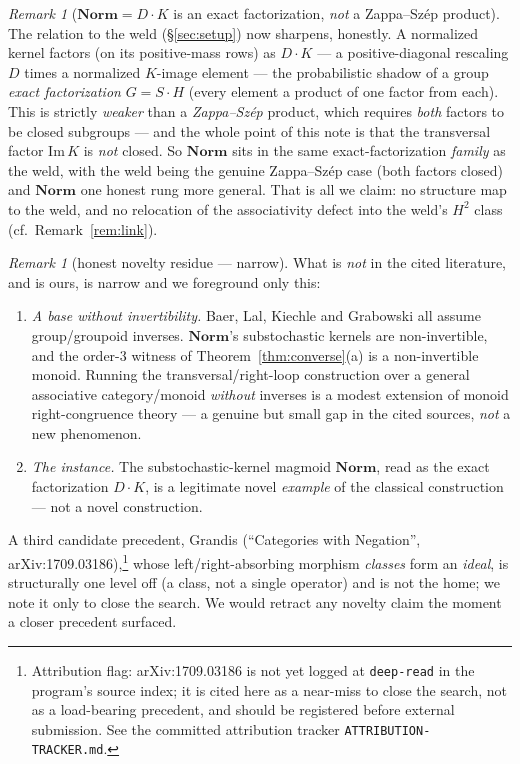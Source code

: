 \documentclass[11pt]{amsart}
\theoremstyle{plain}
\theoremstyle{definition}
\theoremstyle{remark}
\newtheorem{remark}[theorem]{Remark}
\newcommand{\Norm}{\mathbf{Norm}}
\newcommand{\Img}{\mathrm{Im}\,}
\begin{document}
\begin{remark}[$\Norm = D\cdot K$ is an exact factorization, \emph{not} a Zappa--Sz\'ep product]
\label{rem:zs}
The relation to the weld (\S\ref{sec:setup}) now sharpens, honestly. A normalized kernel factors (on
its positive-mass rows) as $D\cdot K$ --- a positive-diagonal rescaling $D$ times a normalized
$K$-image element --- the probabilistic shadow of a group \emph{exact factorization} $G=S\cdot H$
(every element a product of one factor from each). This is strictly \emph{weaker} than a
\emph{Zappa--Sz\'ep} product, which requires \emph{both} factors to be closed subgroups --- and the
whole point of this note is that the transversal factor $\Img K$ is \emph{not} closed. So $\Norm$
sits in the same exact-factorization \emph{family} as the weld, with the weld being the genuine
Zappa--Sz\'ep case (both factors closed) and $\Norm$ one honest rung more general. That is all we
claim: no structure map to the weld, and no relocation of the associativity defect into the weld's
$H^2$ class (cf.\ Remark~\ref{rem:link}).
\end{remark}

\begin{remark}[honest novelty residue --- narrow]
\label{rem:residue}
What is \emph{not} in the cited literature, and is ours, is narrow and we foreground only this:
\begin{enumerate}
  \item \emph{A base without invertibility.} Baer, Lal, Kiechle and Grabowski all assume
        group/groupoid inverses. $\Norm$'s substochastic kernels are non-invertible, and the
        order-$3$ witness of Theorem~\ref{thm:converse}(a) is a non-invertible monoid. Running the
        transversal/right-loop construction over a general associative category/monoid \emph{without}
        inverses is a modest extension of monoid right-congruence theory --- a genuine but small gap
        in the cited sources, \emph{not} a new phenomenon.
  \item \emph{The instance.} The substochastic-kernel magmoid $\Norm$, read as the
        exact factorization $D\cdot K$, is a legitimate novel \emph{example} of the classical
        construction --- not a novel construction.
\end{enumerate}
A third candidate precedent, Grandis (``Categories with Negation'', arXiv:1709.03186),\footnote{%
Attribution flag: arXiv:1709.03186 is not yet logged at \texttt{deep-read} in the program's source
index; it is cited here as a near-miss to close the search, not as a load-bearing precedent, and
should be registered before external submission. See the committed attribution tracker
\texttt{ATTRIBUTION-TRACKER.md}.} whose
left/right-absorbing morphism \emph{classes} form an \emph{ideal}, is structurally one level off (a
class, not a single operator) and is not the home; we note it only to close the search. We would
retract any novelty claim the moment a closer precedent surfaced.
\end{remark}
\end{document}
